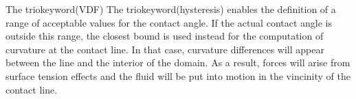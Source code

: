 The triokeyword(VDF)
The triokeyword(hysteresis) enables the definition of a range of acceptable values for the contact angle. 
If the actual contact angle is outside this range, the closest bound is used instead for the computation 
of curvature at the contact line. In that case, curvature differences will appear between the line and the 
interior of the domain. As a result, forces will arise from surface tension effects and the fluid will be 
put into motion in the vincinity of the contact line. 
